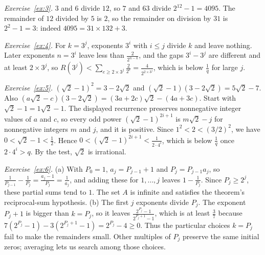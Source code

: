 \documentclass[10pt]{article}
\theoremstyle{plain}
\theoremstyle{definition}
\theoremstyle{remark}
\begin{document}
\emph{Exercise~\ref{ex:3}.} $3$ and $6$ divide $12$, so $7$ and $63$ divide
$2^{12}-1=4095$. The remainder of $12$ divided by $5$ is $2$, so the remainder
on division by $31$ is $2^2-1=3$: indeed $4095=31\times132+3$.

\emph{Exercise~\ref{ex:4}.} For $k=3^j$, exponents $3^i$ with $i\le j$ divide
$k$ and leave nothing. Later exponents $n=3^i$ leave less than
$\tfrac2{2^{n-k}}$, and the gaps $3^i-3^j$ are different and at least
$2\times3^j$, so $R(3^j)<\sum_{e\ge2\times3^j}\tfrac2{2^e}=\tfrac4{2^{2\times3^j}}$,
which is below $\tfrac1q$ for large $j$.

\emph{Exercise~\ref{ex:5}.} $(\sqrt2-1)^2=3-2\sqrt2$ and
$(\sqrt2-1)(3-2\sqrt2)=5\sqrt2-7$. Also
$(a\sqrt2-c)(3-2\sqrt2)=(3a+2c)\sqrt2-(4a+3c)$. Start with $\sqrt2-1=1\sqrt2-1$. The displayed recurrence preserves
nonnegative integer values of $a$ and $c$, so every odd power
$(\sqrt2-1)^{2i+1}$ is $m\sqrt2-j$ for nonnegative integers $m$ and $j$, and it is
positive. Since $1^2<2<(3/2)^2$, we have $0<\sqrt2-1<\tfrac12$. Hence
$0<(\sqrt2-1)^{2i+1}<\tfrac1{2\cdot4^i}$, which is below $\tfrac1q$ once
$2\cdot4^i>q$. By the test, $\sqrt2$ is irrational.

\begin{samepage}
\emph{Exercise~\ref{ex:6}.} (a) With $P_0=1$, $a_j=P_{j-1}+1$ and
$P_j=P_{j-1}a_j$, so
$\tfrac1{P_{j-1}}-\tfrac1{P_j}=\tfrac{a_j-1}{P_j}=\tfrac1{a_j}$, and adding
these for $1,\dots,j$ leaves $1-\tfrac1{P_j}$. Since $P_j\ge2^j$,
these partial sums tend to $1$. The set $A$ is infinite and satisfies
the theorem's reciprocal-sum hypothesis. (b) The first $j$ exponents
divide $P_j$. The exponent $P_j+1$ is bigger than $k=P_j$, so it leaves
$\tfrac{2^{P_j}-1}{2^{P_j+1}-1}$, which is at least $\tfrac37$ because
$7(2^{P_j}-1)-3(2^{P_j+1}-1)=2^{P_j}-4\ge0$. Thus the particular choices
$k=P_j$ fail to make the remainders small. Other multiples of $P_j$ preserve
the same initial zeros; averaging lets us search among those choices.\par
\end{samepage}

\endgroup
\end{document}
